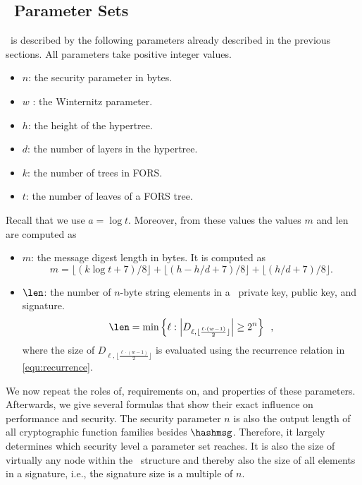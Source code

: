 \subsection{\SPHINCSA\ Parameter Sets}

\SPHINCSA\ is described by the following parameters already described in the previous sections. All parameters take positive integer values.

\begin{itemize}

\item $n$: the security parameter in bytes.

\item $w$ : the Winternitz parameter.

\item $h$: the height of the hypertree.

\item $d$: the number of layers in the hypertree.

\item $k$: the number of trees in FORS.

\item $t$: the number of leaves of a FORS tree. 

\end{itemize}


Recall that we use $a=\log t$. Moreover, from these values the values $m$ and len are computed as
\begin{itemize}
    \item $ m $: the message digest length in bytes. It is computed as $$m=\lfloor(k\log t+7)/8\rfloor+\lfloor(h-h/d+7)/8\rfloor+\lfloor(h/d+7)/8\rfloor.$$
    \item $\len$: the number of $n$-byte string elements in a \WOTSCS\ private key, public key, and signature.
    $$
    \len = \min \left\{ \ell : \left| D_{\ell, \lfloor \frac{\ell \cdot (w-1)}{2} \rfloor} \right| \geq 2^n \right\} \enspace,
    $$
    where the size of $D_{\ell, \lfloor \frac{\ell \cdot (w-1)}{2} \rfloor}$ is evaluated using the recurrence relation in \cref{equ:recurrence}.
\end{itemize}

We now repeat the roles of, requirements on, and properties of these parameters. Afterwards, we give several formulas that show their exact influence on performance and security. The security parameter $n$ is also the output length of all cryptographic function families besides $\hashmsg$. Therefore, it largely determines which security level a parameter set reaches. It is also the size of virtually any node within the \SPHINCSA\ structure and thereby also the size of all elements in a signature, i.e., the signature size is a multiple of $n$.

